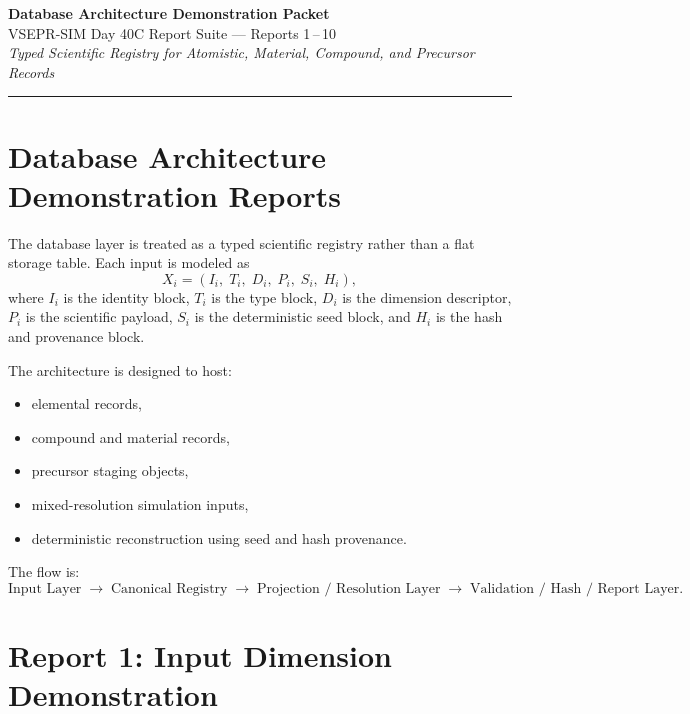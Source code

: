 \documentclass[11pt, a4paper, oneside]{article}
\begin{document}
\begin{center}
{\LARGE\bfseries Database Architecture Demonstration Packet}\\[0.6em]
{\large VSEPR-SIM Day 40C Report Suite — Reports 1\,--\,10}\\[0.4em]
{\normalsize\itshape Typed Scientific Registry for Atomistic,
  Material, Compound, and Precursor Records}\\[1.2em]
\rule{0.7\textwidth}{0.5pt}
\end{center}
\vspace{1em}

\tableofcontents
\newpage

\section{Database Architecture Demonstration Reports}
\label{sec:db_arch}

The database layer is treated as a typed scientific registry rather than a flat
storage table.  Each input is modeled as
\begin{equation}
\label{eq:generic_record}
X_i = (I_i,\; T_i,\; D_i,\; P_i,\; S_i,\; H_i),
\end{equation}
where $I_i$ is the identity block, $T_i$ is the type block, $D_i$ is the
dimension descriptor, $P_i$ is the scientific payload, $S_i$ is the
deterministic seed block, and $H_i$ is the hash and provenance block.

The architecture is designed to host:
\begin{itemize}
  \item elemental records,
  \item compound and material records,
  \item precursor staging objects,
  \item mixed-resolution simulation inputs,
  \item deterministic reconstruction using seed and hash provenance.
\end{itemize}

The flow is:
\[
\text{Input Layer}
\;\longrightarrow\;
\text{Canonical Registry}
\;\longrightarrow\;
\text{Projection / Resolution Layer}
\;\longrightarrow\;
\text{Validation / Hash / Report Layer}.
\]


\section{Report 1: Input Dimension Demonstration}
\label{sec:report1}
\end{document}
